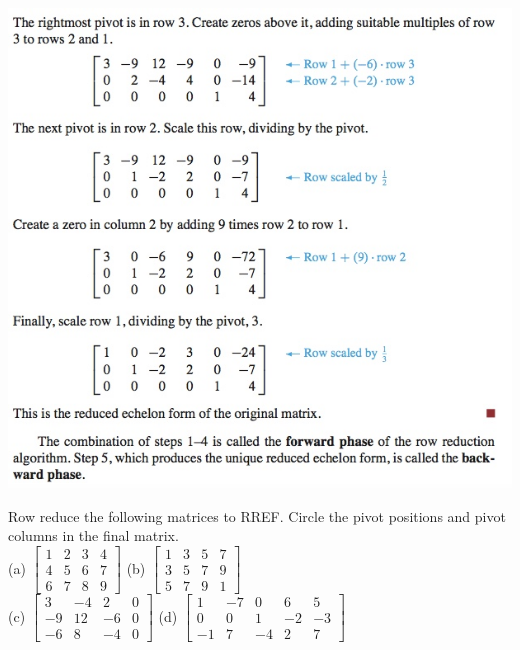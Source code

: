 \documentclass[12pt,letterpaper,reqno]{article}
\numberwithin{equation}{section}
\begin{document}
\begin{center}
\includegraphics[scale=0.8]{figures_mvc/algo_step_7}	
\end{center}

\begin{exercise}
Row reduce the following matrices to RREF. Circle the pivot positions and pivot columns in the final matrix. \\
\vspace{0.25cm}
(a) $\begin{bmatrix}
	1 & 2 & 3 & 4 \\ 4 & 5 & 6 & 7 \\ 6 & 7 & 8 & 9
\end{bmatrix}$ \hspace{1.5cm} (b) $\begin{bmatrix}
	1 & 3 & 5 & 7 \\ 3 & 5 & 7 & 9 \\ 5 & 7 & 9 & 1
\end{bmatrix}$ \\
\vspace{0.25cm}
(c) $\begin{bmatrix}
	3 & -4 & 2 & 0 \\ -9 & 12 & -6 & 0 \\ -6 & 8 & -4 & 0
\end{bmatrix}$ \hspace{1.5cm} (d) $\begin{bmatrix}
	1 & -7 & 0 & 6 & 5 \\0 & 0 & 1 & -2 & -3 \\ -1 & 7 & -4 & 2 & 7
\end{bmatrix}$ 	
\end{exercise}
\end{document}
